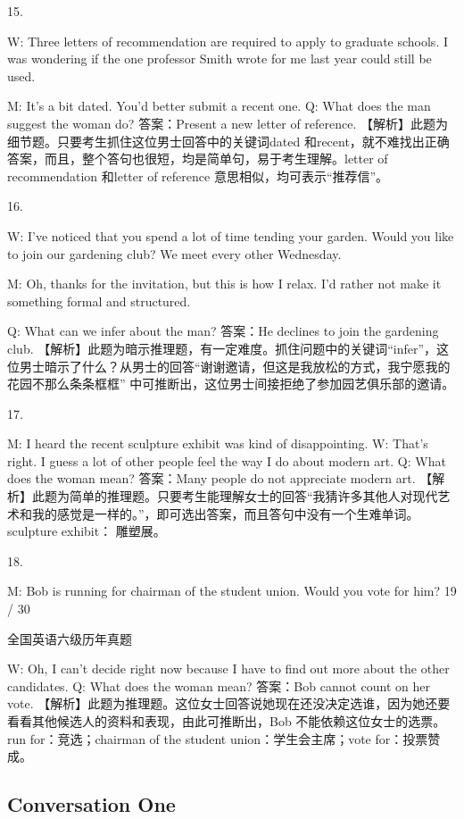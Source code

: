 \documentclass[UTF8,11pt]{ctexart}
\begin{document}
15.


W: Three letters of recommendation are required to apply to graduate schools. I was wondering if the one professor Smith wrote for me last year could still be used.


M: It’s a bit dated. You’d better submit a recent one. Q: What does the man suggest the woman do? 答案：Present a new letter of reference. 【解析】此题为细节题。只要考生抓住这位男士回答中的关键词dated 和recent，就不难找出正确答案，而且，整个答句也很短，均是简单句，易于考生理解。letter of recommendation 和letter of reference 意思相似，均可表示“推荐信”。


16.


W: I’ve noticed that you spend a lot of time tending your garden. Would you like to join our gardening club? We meet every other Wednesday.


M: Oh, thanks for the invitation, but this is how I relax. I’d rather not make it something formal and structured.


Q: What can we infer about the man? 答案：He declines to join the gardening club. 【解析】此题为暗示推理题，有一定难度。抓住问题中的关键词“infer”，这位男士暗示了什么？从男士的回答“谢谢邀请，但这是我放松的方式，我宁愿我的花园不那么条条框框” 中可推断出，这位男士间接拒绝了参加园艺俱乐部的邀请。


17.


M: I heard the recent sculpture exhibit was kind of disappointing. W: That’s right. I guess a lot of other people feel the way I do about modern art. Q: What does the woman mean? 答案：Many people do not appreciate modern art. 【解析】此题为简单的推理题。只要考生能理解女士的回答“我猜许多其他人对现代艺术和我的感觉是一样的。”，即可选出答案，而且答句中没有一个生难单词。sculpture exhibit： 雕塑展。


18.


M: Bob is running for chairman of the student union. Would you vote for him? 19 / 30


全国英语六级历年真题


W: Oh, I can’t decide right now because I have to find out more about the other candidates. Q: What does the woman mean? 答案：Bob cannot count on her vote. 【解析】此题为推理题。这位女士回答说她现在还没决定选谁，因为她还要看看其他候选人的资料和表现，由此可推断出，Bob 不能依赖这位女士的选票。run for：竞选；chairman of the student union：学生会主席；vote for：投票赞成。


\subsection*{Conversation One}
\end{document}
